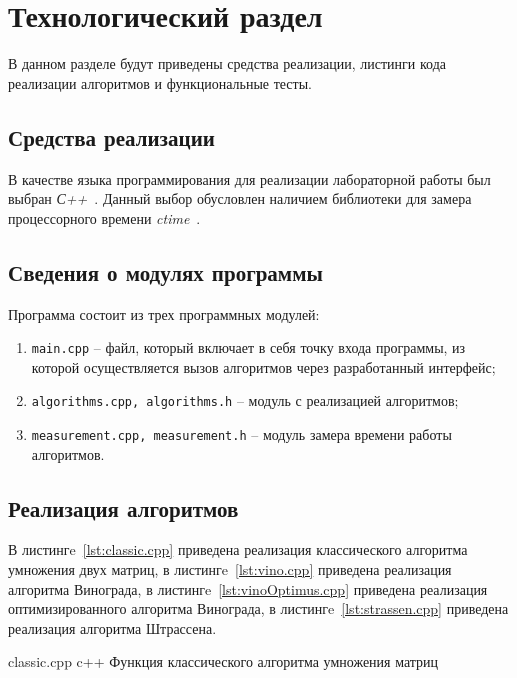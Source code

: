 \chapter{Технологический раздел}

В данном разделе будут приведены средства реализации, листинги кода реализации алгоритмов и функциональные тесты.

\section{Средства реализации}

В качестве языка программирования для реализации лабораторной работы был выбран \textit{С++}~\cite{cplusplus}.
Данный выбор обусловлен наличием библиотеки для замера процессорного времени \textit{ctime}~\cite{ctime}.

\section{Сведения о модулях программы}
Программа состоит из трех программных модулей:
\begin{enumerate}
	\item \texttt{main.cpp} -- файл, который включает в себя точку входа программы, из которой осуществляется вызов алгоритмов через разработанный интерфейс;
	\item \texttt{algorithms.cpp, algorithms.h} -- модуль с реализацией алгоритмов;
	\item \texttt{measurement.cpp, measurement.h} -- модуль замера времени работы алгоритмов.
\end{enumerate}

\section{Реализация алгоритмов}

В листингe~\ref{lst:classic.cpp} приведена реализация классического алгоритма умножения двух матриц, в листингe~\ref{lst:vino.cpp} приведена реализация алгоритма Винограда, в листингe~\ref{lst:vinoOptimus.cpp} приведена реализация оптимизированного алгоритма Винограда, в листингe~\ref{lst:strassen.cpp} приведена реализация алгоритма Штрассена.

\newpage
{}
	{classic.cpp} %
	{c++} %
	{Функция классического алгоритма умножения матриц} %

